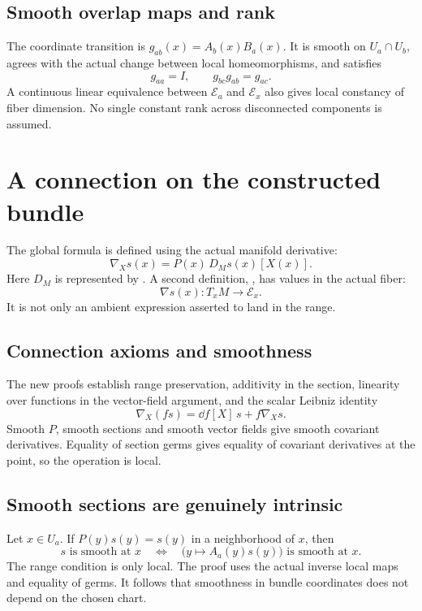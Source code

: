 \subsection{Smooth overlap maps and rank}
The coordinate transition is $g_{ab}(x)=A_b(x)B_a(x)$. It is smooth on $U_a\cap U_b$, agrees with the actual change between local homeomorphisms, and satisfies
\[
g_{aa}=I,\qquad g_{bc}g_{ab}=g_{ac}.
\]
A continuous linear equivalence between $\mathcal E_a$ and $\mathcal E_x$ also gives local constancy of fiber dimension. No single constant rank across disconnected components is assumed.





\section{A connection on the constructed bundle}\label{supp6:section:003}
The global formula is defined using the actual manifold derivative:
\[
\nabla_Xs(x)=P(x)\,D_Ms(x)[X(x)].
\]
Here $D_M$ is represented by . A second definition, , has values in the actual fiber:
\[
\nabla s(x):T_xM\longrightarrow\mathcal E_x.
\]
It is not only an ambient expression asserted to land in the range.

\subsection{Connection axioms and smoothness}
The new proofs establish range preservation, additivity in the section, linearity over functions in the vector-field argument, and the scalar Leibniz identity
\[
\nabla_X(fs)=\dd f[X]\,s+f\nabla_Xs.
\]
Smooth $P$, smooth sections and smooth vector fields give smooth covariant derivatives. Equality of section germs gives equality of covariant derivatives at the point, so the operation is local.

\subsection{Smooth sections are genuinely intrinsic}
Let $x\in U_a$. If $P(y)s(y)=s(y)$ in a neighborhood of $x$, then
\[
s\text{ is smooth at }x
\quad\Longleftrightarrow\quad
\bigl(y\mapsto A_a(y)s(y)\bigr)\text{ is smooth at }x.
\]
The range condition is only local. The proof uses the actual inverse local maps and equality of germs. It follows that smoothness in bundle coordinates does not depend on the chosen chart.

